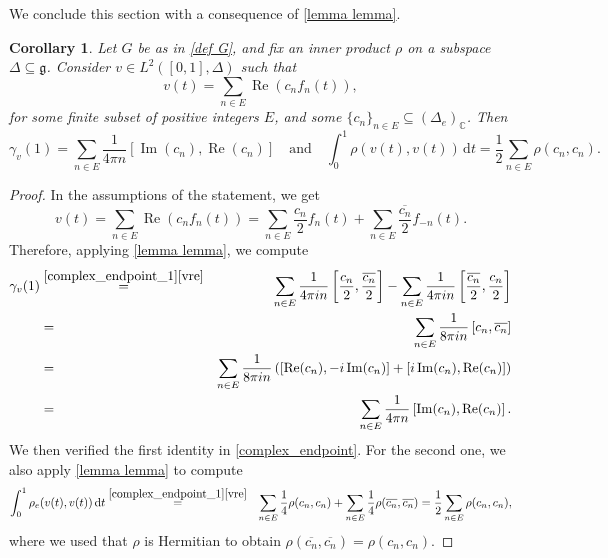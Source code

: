\documentclass[a4paper,11pt,reqno]{amsart}
\theoremstyle{plain}
\newtheorem{corollary}[theorem]{Corollary}
\theoremstyle{definition}
\newcommand{\re}{\operatorname{Re}}
\newcommand{\im}{\operatorname{Im}}
\newcommand{\C}{\mathbb C}
\newcommand{\g}{\mathfrak{g}}
\newcommand{\id}{e}
\newcommand{\de}{\mathrm{d}}
\begin{document}
We conclude this section with a consequence of \cref{lemma lemma}.

\begin{corollary} \label{corollary_ortogonal}
 Let $G$ be as in \eqref{def G}, and fix an inner product $\rho$ on a subspace $\Delta \subseteq \g$. Consider $v \in L^2([0,1],\Delta)$ such that
 \begin{equation*} 
 v(t) = \sum_{n \in E} \re(c_nf_n(t)), 
 \end{equation*}
 for some finite subset of positive integers $E$, and some $\{c_n\}_{n\in E} \subseteq (\Delta_\id)_\C$. Then
\begin{equation} \label{complex_endpoint}
 \gamma_v(1) = \sum_{n \in E} \frac{1}{4 \pi n} [\im(c_n),\re(c_n)] \quad \text{and} \quad \int^1_0 \rho(v(t),v(t)) \, \de t = \frac{1}{2} \sum_{n \in E} \rho(c_n,c_n).
\end{equation}
\end{corollary}

\begin{proof}
 In the assumptions of the statement, we get
 \begin{equation} \label{vre}
 v(t)=\sum_{n \in E} \re(c_nf_n(t))=\sum_{n \in E} \frac{c_n}{2}f_n(t) + \sum_{n \in E} \frac{\overline{c_n}}{2}f_{-n}(t).
 \end{equation}
 Therefore, applying \cref{lemma lemma}, we compute
 \begin{eqnarray*}
 \gamma_v(1) &\stackrel{\eqref{complex_endpoint_1}\eqref{vre}}{=}& \sum_{n \in E} \frac{1}{4 \pi i n}\left[\frac{c_n}{2}, \frac{\overline{c_n}}{2}\right] - \sum_{n \in E} \frac{1}{4 \pi i n}\left[\frac{\overline{c_n}}{2},\frac{c_n}{2} \right]\\
 &=& \sum_{n \in E} \frac{1}{8 \pi i n}\left[c_n,\overline{c_n} \right] \\
 &=&\sum_{n \in E} \frac{1}{8 \pi i n} \left(\left[\re(c_n),-i \im(c_n)\right]+ \left[i \im(c_n), \re(c_n)\right]\right) \\
 &=& \sum_{n \in E} \frac{1}{4 \pi n} \left[\im(c_n), \re(c_n)\right].
 \end{eqnarray*}
 We then verified the first identity in \eqref{complex_endpoint}. For the second one, we also apply \cref{lemma lemma} to compute
 \begin{eqnarray*}
 \int^1_0 \rho_\id(v(t),v(t)) \, \de t &\stackrel{\eqref{complex_endpoint_1}\eqref{vre}}{=}& \sum_{n \in E } \frac{1}{4} \rho(c_n,c_n) + \sum_{n \in E } \frac{1}{4} \rho(\overline{c_n},\overline{c_n}) = \frac{1}{2}\sum_{n \in E } \rho(c_n,c_n),
 \end{eqnarray*}
 where we used that $\rho$ is Hermitian to obtain $\rho(\overline{c_n},\overline{c_n})=\rho(c_n,c_n)$.
\end{proof}
\end{document}

